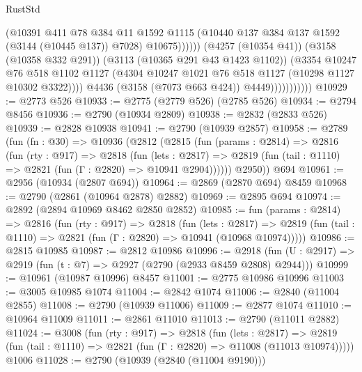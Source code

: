 \begin{lexlean}{RustStd}
\begin{coremodule}
{\begin{coremodule}
{{{{{{{{{{{{{{{{{{{{{{{{{{                                      (@10391
                                        @411
                                        @78
                                        @384
                                        @11
                                        @1592
                                        @1115
                                        (@10440 @137 @384 @137 @1592 (@3144 (@10445 @137)) @7028)
                                        @10675))))))
                            (@4257 (@10354 @41))
                            (@3158 (@10358 @332 @291))
                            (@3113 (@10365 @291 @43 @1423 @1102))
                            (@3354
                              @10247
                              @76
                              @518
                              @1102
                              @1127
                              (@4304 @10247 @1021 @76 @518 @1127 (@10298 @1127 @10302 @3322))))
                          @4436
                          (@3158 (@7073 @663 @424))
                          @4449)))))))))))
@10929 := @2773 @526
@10933 := @2775 (@2779 @526) (@2785 @526)
@10934 := @2794 @8456
@10936 := @2790 (@10934 @2809)
@10938 := @2832 (@2833 @526)
@10939 := @2828 @10938
@10941 := @2790 (@10939 @2857)
@10958 := @2789
    (fun (fn : @30) =>
    @10936
      (@2812
        (@2815
          (fun (params : @2814) =>
          @2816
            (fun (rty : @917) =>
            @2818
              (fun (lets : @2817) =>
              @2819 (fun (tail : @1110) => @2821 (fun (Γ : @2820) => @10941 @2904))))))
        @2950))
    @694
@10961 := @2956 (@10934 (@2807 @694))
@10964 := @2869 (@2870 @694) @8459
@10968 := @2790 (@2861 (@10964 @2878) @2882)
@10969 := @2895 @694
@10974 := @2892 (@2894 @10969 @8462 @2850 @2852)
@10985 := fun (params : @2814) =>
  @2816
    (fun (rty : @917) =>
    @2818
      (fun (lets : @2817) =>
      @2819 (fun (tail : @1110) => @2821 (fun (Γ : @2820) => @10941 (@10968 @10974)))))
@10986 := @2815 @10985
@10987 := @2812 @10986
@10996 := @2918 (fun (U : @2917) => @2919 (fun (t : @7) => @2927 (@2790 (@2933 @8459 @2808) @2944)))
@10999 := @10961 (@10987 @10996) @8457
@11001 := @2775 @10986 @10996
@11003 := @3005 @10985 @1074
@11004 := @2842 @1074
@11006 := @2840 (@11004 @2855)
@11008 := @2790 (@10939 @11006)
@11009 := @2877 @1074
@11010 := @10964 @11009
@11011 := @2861 @11010
@11013 := @2790 (@11011 @2882)
@11024 := @3008
    (fun (rty : @917) =>
    @2818
      (fun (lets : @2817) =>
      @2819 (fun (tail : @1110) => @2821 (fun (Γ : @2820) => @11008 (@11013 @10974)))))
    @1006
@11028 := @2790 (@10939 (@2840 (@11004 @9190)))
}}}}}}}}}}}}}}}}}}}}}}}}}}
\end{coremodule}}
\end{coremodule}
\end{lexlean}
